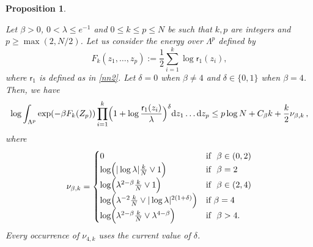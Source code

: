\documentclass[a4paper,10pt,leqno]{amsart}
\numberwithin{equation}{section}
\newtheorem{prop}{Proposition}[section]
\newcommand{\dd}{\mathrm{d}}
\def\hal{\frac{1}{2}}
\def\rr{\mathsf{r}}
\begin{document}
\begin{prop}\label{prop:auxk}

  Let $\beta>0$, $0<\lambda\le e^{-1}$ and $0\le k\le p\le N$ be such that $k,p$ are integers and $p\ge\max(2,N/2)$. Let us consider the energy over $\Lambda^{p}$ defined by
  \begin{equation} \label{defFaux}
    F_k(z_1, \dots, z_p) := \hal \sum_{i=1}^{k} \log \rr_1(z_i),
  \end{equation}
  where $\rr_1$ is defined as in \eqref{nn2}.
  Let $\delta=0$ when $\beta\neq 4$ and $\delta\in \{0,1\}$ when $\beta=4$. Then, we have
  \[
    \log \int_{\Lambda^p} \exp(-\beta F_k(Z_p))\prod_{i=1}^k \Bigl(1+\log \frac{\rr_1(z_i)}{\lambda}\Bigr)^{\delta}\dd z_1\ldots \dd z_p \leq p \log N+C_\beta k+\frac{k}{2}\nu_{\beta,k}\,,
  \]
  where
  \begin{equation}\label{def:gbetak}
    \nu_{\beta,k}= \begin{cases}
      0 & \text{if } \ \beta \in (0,2)
      \\ \log\Bigl(|\log \lambda| \frac{k}{N} \vee 1\Bigr)& \text{if } \ \beta =2
      \\ \log\Bigl(\lambda^{2-\beta}\frac{k}{N}\vee 1\Bigr) & \text{if } \ \beta\in (2,4)
      \\ \log\Bigl(\lambda^{-2}\frac{k}{N}\vee |\log\lambda|^{2(1+\delta)}\Bigr)& \text{if $\beta=4$ }
      \\ \log\Bigl(\lambda^{2-\beta}\frac{k}{N}\vee \lambda^{4-\beta}\Bigr) & \text{if } \ \beta>4.
    \end{cases}
  \end{equation}
  Every occurrence of $\nu_{4,k}$ uses the current value of $\delta$.
\end{prop}

\medskip
\end{document}
